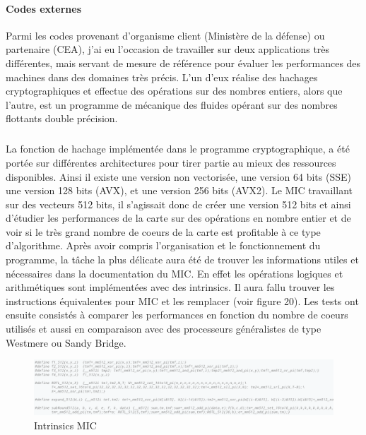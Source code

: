 \documentclass{article}
\begin{document}
				\paragraph{Codes externes}
				Parmi les codes provenant d'organisme client (Ministère de la défense) ou partenaire (CEA), j'ai eu l'occasion 
				de travailler sur deux applications très différentes, mais servant de mesure de référence pour évaluer les 
				performances des machines dans des domaines très précis. L'un d'eux réalise des hachages cryptographiques et 
				effectue des opérations sur des nombres entiers, alors que l'autre, est un programme de mécanique des fluides 
				opérant sur des nombres flottants double précision.
					\subparagraph{}
					La fonction de hachage implémentée dans le programme cryptographique, a été portée sur différentes architectures 
					pour tirer partie au mieux des ressources disponibles. Ainsi il existe une version non vectorisée, une version 64 bits (SSE) 
					une version 128 bits (AVX), et une version 256 bits (AVX2). Le MIC travaillant sur des vecteurs 512 bits, 
					il s'agissait donc de créer une version 512 bits et ainsi d'étudier les performances de la carte sur des 
					opérations en nombre entier et de voir si le très grand nombre de coeurs de la carte est profitable à ce 
					type d'algorithme. \newline
					Après avoir compris l'organisation et le fonctionnement du programme, la tâche la plus délicate aura été
					de trouver les informations utiles et nécessaires dans la documentation du MIC. En effet les opérations 
					logiques et arithmétiques sont implémentées avec des intrinsics. Il aura fallu trouver les instructions 
					équivalentes pour MIC et les remplacer (voir figure 20). \newline
					Les tests ont ensuite consistés à comparer les performances en fonction du nombre de coeurs utilisés et 
					aussi en comparaison avec des processeurs généralistes de type Westmere ou Sandy Bridge.
					\begin{figure}
					\begin{center}
					\includegraphics[scale=0.5]{intrinsics.png}
					\caption{Intrinsics MIC}
					\end{center}
					\end{figure}
\end{document}
